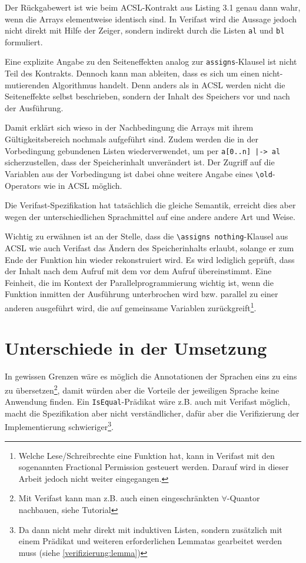 Der Rückgabewert ist wie beim ACSL-Kontrakt aus Listing 3.1 genau dann wahr, wenn die Arrays elementweise
identisch sind. In Verifast wird die Aussage jedoch nicht direkt mit Hilfe der Zeiger, sondern indirekt durch die
Listen \lstinline{al} und \lstinline{bl} formuliert.

Eine explizite Angabe zu den Seiteneffekten analog zur \lstinline{assigns}-Klausel ist nicht Teil des Kontrakts. 
Dennoch kann man ableiten, dass es sich um einen nicht-mutierenden Algorithmus handelt. Denn anders als in ACSL
werden nicht die Seiteneffekte selbst beschrieben, sondern der Inhalt des Speichers vor und nach der Ausführung.

Damit erklärt sich wieso in der Nachbedingung die Arrays mit ihrem Gültigkeitsbereich nochmals aufgeführt sind.
Zudem werden die in der Vorbedingung gebundenen Listen wiederverwendet, um per \lstinline{a[0..n] |-> al}
sicherzustellen, dass der Speicherinhalt unverändert ist. Der Zugriff auf die Variablen aus der Vorbedingung ist
dabei ohne weitere Angabe eines \lstinline{\old}-Operators wie in ACSL möglich.

Die Verifast-Spezifikation hat tatsächlich die gleiche Semantik, erreicht dies aber wegen der 
unterschiedlichen Sprachmittel auf eine andere andere Art und Weise.

Wichtig zu erwähnen ist an der Stelle, dass die \lstinline{\assigns nothing}-Klausel aus ACSL wie auch Verifast 
das Ändern des Speicherinhalts erlaubt, solange er zum Ende der Funktion hin wieder rekonstruiert wird.
Es wird lediglich geprüft, dass der Inhalt nach dem Aufruf mit dem vor dem Aufruf übereinstimmt. Eine Feinheit, die im 
Kontext der Parallelprogrammierung wichtig ist, wenn die Funktion inmitten der Ausführung unterbrochen wird bzw. parallel 
zu einer anderen ausgeführt wird, die auf gemeinsame Variablen zurückgreift\footnote{Welche Lese/Schreibrechte
eine Funktion hat, kann in Verifast mit den sogenannten Fractional Permission gesteuert werden. Darauf wird in dieser Arbeit
jedoch nicht weiter eingegangen.}.


\section{Unterschiede in der Umsetzung}

In gewissen Grenzen wäre es möglich die Annotationen der Sprachen eins zu eins zu übersetzen\footnote{Mit
Verifast kann man z.B. auch einen eingeschränkten \(\forall\)-Quantor nachbauen, siehe Tutorial\cite[Kap. 17]{jacobs-tutorial}},
damit würden aber die Vorteile der jeweiligen Sprache keine Anwendung finden. Ein \lstinline{IsEqual}-Prädikat wäre z.B.
auch mit Verifast möglich, macht die Spezifikation aber nicht verständlicher, dafür aber die Verifizierung
der Implementierung schwieriger\footnote{Da dann nicht mehr direkt mit induktiven Listen, sondern zusätzlich
mit einem Prädikat und weiteren erforderlichen Lemmatas gearbeitet werden muss (siehe \ref{verifizierung:lemma})}.

